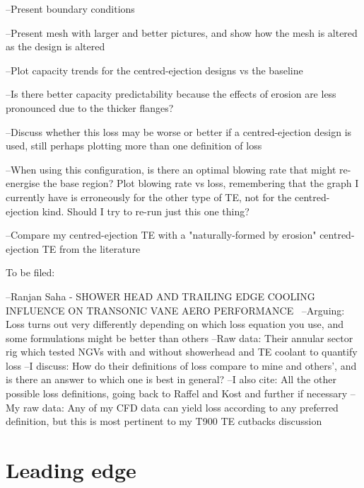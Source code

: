 \documentclass[a4paper, 11pt, twoside]{report}
\begin{document}
--Present boundary conditions

--Present mesh with larger and better pictures, and show how the mesh is altered as the design is altered

--Plot capacity trends for the centred-ejection designs vs the baseline

--Is there better capacity predictability because the effects of erosion are less pronounced due to the thicker flanges?

--Discuss whether this loss may be worse or better if a centred-ejection design is used, still perhaps plotting more than one definition of loss

--When using this configuration, is there an optimal blowing rate that might re-energise the base region? Plot blowing rate vs loss, remembering that the graph I currently have is erroneously for the other type of TE, not for the centred-ejection kind. Should I try to re-run just this one thing?

--Compare my centred-ejection TE with a "naturally-formed by erosion" centred-ejection TE from the literature 


 
 


To be filed:

--Ranjan Saha - SHOWER HEAD AND TRAILING EDGE COOLING INFLUENCE ON TRANSONIC VANE AERO PERFORMANCE~\cite{saha_loss}
	--Arguing: Loss turns out very differently depending on which loss equation you use, and some formulations might be better than others
	--Raw data: Their annular sector rig which tested NGVs with and without showerhead and TE coolant to quantify loss
	--I discuss: How do their definitions of loss compare to mine and others', and is there an answer to which one is best in general?
	--I also cite: All the other possible loss definitions, going back to Raffel and Kost and further if necessary
	--My raw data: Any of my CFD data can yield loss according to any preferred definition, but this is most pertinent to my T900 TE cutbacks discussion





\chapter{Leading edge}
\label{chapter_leading_edge}

\end{document}
